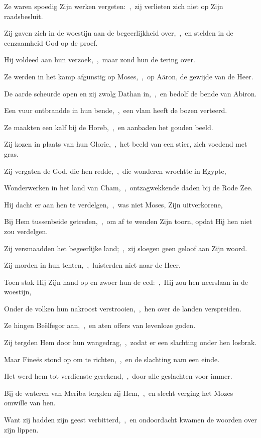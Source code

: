 \documentclass[12pt,twoside,a5paper]{article}
\begin{document}

\begin{halfparskip}
  Ze waren spoedig Zijn werken vergeten:~\sep\ zij verlieten zich niet op Zijn raadsbesluit.

  Zij gaven zich in de woestijn aan de begeerlijkheid over,~\sep\ en stelden in de eenzaamheid God op de proef.

  Hij voldeed aan hun verzoek,~\sep\ maar zond hun de tering over.

  Ze werden in het kamp afgunstig op Moses,~\sep\ op Aäron, de gewijde van de Heer.

  De aarde scheurde open en zij zwolg Dathan in,~\sep\ en bedolf de bende van Abiron.

  Een vuur ontbrandde in hun bende,~\sep\ een vlam heeft de bozen verteerd.

  Ze maakten een kalf bij de Horeb,~\sep\ en aanbaden het gouden beeld.

  Zij kozen in plaats van hun Glorie,~\sep\ het beeld van een stier, zich voedend met gras.

  Zij vergaten de God, die hen redde,~\sep\ die wonderen wrochtte in Egypte,

  Wonderwerken in het land van Cham,~\sep\ ontzagwekkende daden bij de Rode Zee.

  Hij dacht er aan hen te verdelgen,~\sep\ was niet Moses, Zijn uitverkorene,

  Bij Hem tussenbeide getreden,~\sep\ om af te wenden Zijn toorn, opdat Hij hen niet zou verdelgen.

  Zij versmaadden het begeerlijke land;~\sep\ zij sloegen geen geloof aan Zijn woord.

  Zij morden in hun tenten,~\sep\ luisterden niet naar de Heer.

  Toen stak Hij Zijn hand op en zwoer hun de eed:~\sep\ Hij zou hen neerslaan in de woestijn,

  Onder de volken hun nakroost verstrooien,~\sep\ hen over de landen verspreiden.

  Ze hingen Beëlfegor aan,~\sep\ en aten offers van levenloze goden.

  Zij tergden Hem door hun wangedrag,~\sep\ zodat er een slachting onder hen losbrak.

  Maar Fineës stond op om te richten,~\sep\ en de slachting nam een einde.

  Het werd hem tot verdienste gerekend,~\sep\ door alle geslachten voor immer.

  Bij de wateren van Meriba tergden zij Hem,~\sep\ en slecht verging het Mozes omwille van hen.

  Want zij hadden zijn geest verbitterd,~\sep\ en ondoordacht kwamen de woorden over zijn lippen.
\end{halfparskip}
\end{document}
